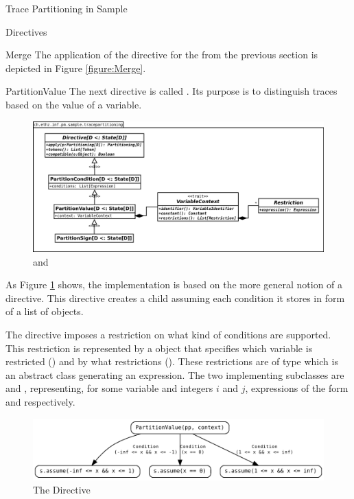 \begin{chapter}{Trace Partitioning in Sample}
\begin{section}{Directives}
\begin{subsection}{Merge}
			The application of the  directive for the  from the previous section is depicted in Figure \ref{figure:Merge}.
		\end{subsection}


		\begin{subsection}{PartitionValue}
			The next directive is called . Its purpose is to distinguish traces based on the value of a variable.

			\begin{figure}
				\includegraphics[width=\textwidth]{Diagrams/PartitionValue.png}
				\caption{ and }
				\label{figure:PartitionValueArchitecture}
			\end{figure}

			As Figure \ref{figure:PartitionValueArchitecture} shows, the implementation is based on the more general notion of a  directive. This directive creates a child assuming each condition it stores in form of a list of  objects.

			The  directive imposes a restriction on what kind of conditions are supported. This restriction is represented by a  object that specifies which variable is restricted () and by what restrictions (). These restrictions are of type  which is an abstract class generating an expression. The two implementing subclasses are  and , representing, for some variable  and integers $i$ and $j$, expressions of the form  and  respectively. 

			\begin{figure}
				\centering
				\includegraphics[width=\textwidth]{Graphs/PartitionValue.pdf}
				\caption{The  Directive}
				\label{figure:PartitionValue}
			\end{figure}


\end{subsection}
\end{section}
\end{chapter}

